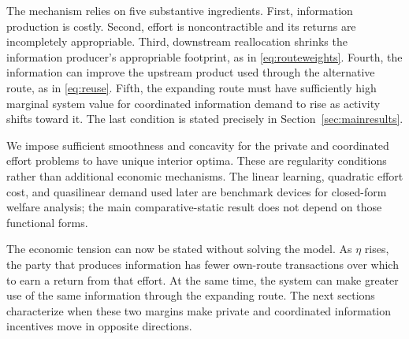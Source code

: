 The mechanism relies on five substantive ingredients. First, information production is costly. Second, effort is noncontractible and its returns are incompletely appropriable. Third, downstream reallocation shrinks the information producer's appropriable footprint, as in \eqref{eq:routeweights}. Fourth, the information can improve the upstream product used through the alternative route, as in \eqref{eq:reuse}. Fifth, the expanding route must have sufficiently high marginal system value for coordinated information demand to rise as activity shifts toward it. The last condition is stated precisely in Section~\ref{sec:mainresults}.

We impose sufficient smoothness and concavity for the private and coordinated effort problems to have unique interior optima. These are regularity conditions rather than additional economic mechanisms. The linear learning, quadratic effort cost, and quasilinear demand used later are benchmark devices for closed-form welfare analysis; the main comparative-static result does not depend on those functional forms.

The economic tension can now be stated without solving the model. As $\eta$ rises, the party that produces information has fewer own-route transactions over which to earn a return from that effort. At the same time, the system can make greater use of the same information through the expanding route. The next sections characterize when these two margins make private and coordinated information incentives move in opposite directions.
